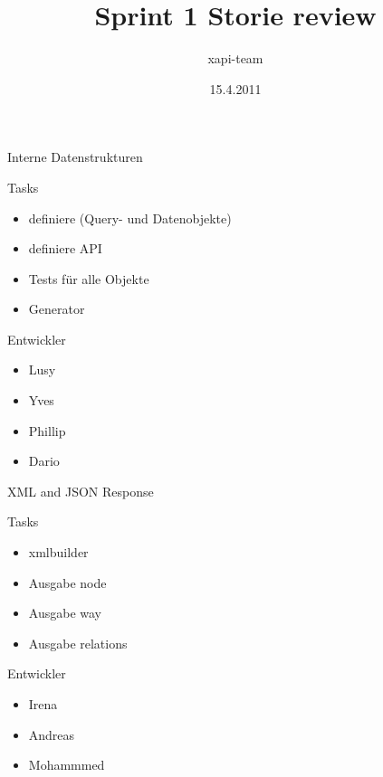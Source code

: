 \documentclass{beamer}
\title{Sprint 1 Storie review}
\author{xapi-team}
\institute{Institute for Computer Science, Free University Berlin}
\date{15.4.2011}
\begin{document}
\begin{frame}
\titlepage
\end{frame}

\begin{frame}{Interne Datenstrukturen}
    
    \begin{block}{Tasks}
        \begin{itemize}
        \item definiere (Query- und Datenobjekte)
        \item definiere API
        \item Tests für alle Objekte
        \item Generator
        \end{itemize}
    \end{block}
    \begin{block}{Entwickler}
        \begin{itemize}
        \item Lusy
        \item Yves
        \item Phillip
        \item Dario
        \end{itemize}
    \end{block}

\end{frame}

\begin{frame}{XML and JSON Response}
    
    \begin{block}{Tasks}
        \begin{itemize}
        \item xmlbuilder
        \item Ausgabe node
        \item Ausgabe way
        \item Ausgabe relations
        \end{itemize}
    \end{block}
    \begin{block}{Entwickler}
        \begin{itemize}
        \item Irena
        \item Andreas
        \item Mohammmed
        \end{itemize}
    \end{block}

\end{frame}
\end{document}
